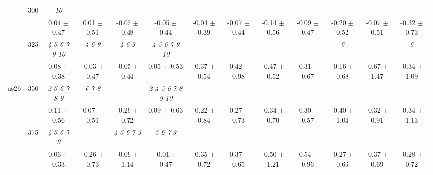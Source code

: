 \begin{table}[h]
{\begin{tabular}{
        ccccccccccccc}
 & \multirow{2}{*}{300}& \textit{ 10 }& & & & & & & & & &  \\ 
 & & 0.04 $\pm$ 0.47& 0.01 $\pm$ 0.51& -0.03 $\pm$ 0.48& -0.05 $\pm$ 0.44& -0.04 $\pm$ 0.39& -0.07 $\pm$ 0.44& -0.14 $\pm$ 0.56& -0.09 $\pm$ 0.47& -0.20 $\pm$ 0.52& -0.07 $\pm$ 0.51& -0.32 $\pm$ 0.73 \\ 
 & \multirow{2}{*}{325}& \cellcolor[HTML]{EFEFEF} \textit{  4  5  6  7  9 10 }& \cellcolor[HTML]{EFEFEF} \textit{ 4 6 9 }& \cellcolor[HTML]{EFEFEF} \textit{ 4 6 9 }& \cellcolor[HTML]{EFEFEF} \textit{  4  5  6  7  9 10 }& \cellcolor[HTML]{EFEFEF} & \cellcolor[HTML]{EFEFEF} & \cellcolor[HTML]{EFEFEF} & \cellcolor[HTML]{EFEFEF} & \cellcolor[HTML]{EFEFEF} \textit{ 6 }& \cellcolor[HTML]{EFEFEF} & \cellcolor[HTML]{EFEFEF} \textit{ 6 } \\ 
 & & \cellcolor[HTML]{EFEFEF} 0.08 $\pm$ 0.38& \cellcolor[HTML]{EFEFEF} -0.03 $\pm$ 0.47& \cellcolor[HTML]{EFEFEF} -0.05 $\pm$ 0.44& \cellcolor[HTML]{EFEFEF} 0.05 $\pm$ 0.53& \cellcolor[HTML]{EFEFEF} -0.37 $\pm$ 0.54& \cellcolor[HTML]{EFEFEF} -0.42 $\pm$ 0.98& \cellcolor[HTML]{EFEFEF} -0.47 $\pm$ 0.52& \cellcolor[HTML]{EFEFEF} -0.31 $\pm$ 0.67& \cellcolor[HTML]{EFEFEF} -0.16 $\pm$ 0.68& \cellcolor[HTML]{EFEFEF} -0.67 $\pm$ 1.47& \cellcolor[HTML]{EFEFEF} -0.34 $\pm$ 1.09 \\ 
 \multirow{4}{*}{us26} & \multirow{2}{*}{350}& \textit{ 2 5 6 7 8 9 }& \textit{ 6 7 8 }& & \textit{  2  4  5  6  7  8  9 10 }& & & & & & &  \\ 
 & & 0.11 $\pm$ 0.56& 0.07 $\pm$ 0.51& -0.29 $\pm$ 0.72& 0.09 $\pm$ 0.63& -0.22 $\pm$ 0.84& -0.27 $\pm$ 0.73& -0.34 $\pm$ 0.70& -0.30 $\pm$ 0.57& -0.40 $\pm$ 1.04& -0.32 $\pm$ 0.91& -0.34 $\pm$ 1.13 \\ 
 & \multirow{2}{*}{375}& \cellcolor[HTML]{EFEFEF} \textit{ 4 5 6 7 9 }& \cellcolor[HTML]{EFEFEF} & \cellcolor[HTML]{EFEFEF} \textit{ 4 5 6 7 9 }& \cellcolor[HTML]{EFEFEF} \textit{ 5 6 7 9 }& \cellcolor[HTML]{EFEFEF} & \cellcolor[HTML]{EFEFEF} & \cellcolor[HTML]{EFEFEF} & \cellcolor[HTML]{EFEFEF} & \cellcolor[HTML]{EFEFEF} & \cellcolor[HTML]{EFEFEF} & \cellcolor[HTML]{EFEFEF}  \\ 
 & & \cellcolor[HTML]{EFEFEF} 0.06 $\pm$ 0.33& \cellcolor[HTML]{EFEFEF} -0.26 $\pm$ 0.73& \cellcolor[HTML]{EFEFEF} -0.09 $\pm$ 1.14& \cellcolor[HTML]{EFEFEF} -0.01 $\pm$ 0.47& \cellcolor[HTML]{EFEFEF} -0.35 $\pm$ 0.72& \cellcolor[HTML]{EFEFEF} -0.37 $\pm$ 0.65& \cellcolor[HTML]{EFEFEF} -0.50 $\pm$ 1.21& \cellcolor[HTML]{EFEFEF} -0.54 $\pm$ 0.96& \cellcolor[HTML]{EFEFEF} -0.27 $\pm$ 0.66& \cellcolor[HTML]{EFEFEF} -0.37 $\pm$ 0.69& \cellcolor[HTML]{EFEFEF} -0.28 $\pm$ 0.72 \\ 

\end{tabular}}
\end{table}

